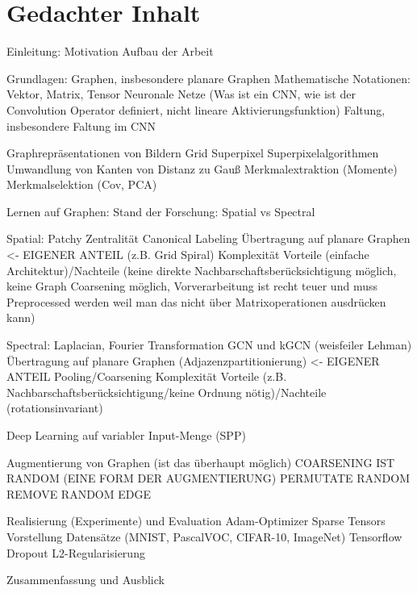 \chapter{Gedachter Inhalt}

Einleitung:
Motivation
Aufbau der Arbeit

Grundlagen:
Graphen, insbesondere planare Graphen
Mathematische Notationen: Vektor, Matrix, Tensor
Neuronale Netze (Was ist ein CNN, wie ist der Convolution Operator definiert, nicht lineare Aktivierungsfunktion)
Faltung, insbesondere Faltung im CNN

Graphrepräsentationen von Bildern
Grid
Superpixel
Superpixelalgorithmen
Umwandlung von Kanten von Distanz zu Gauß
Merkmalextraktion (Momente)
Merkmalselektion (Cov, PCA)

Lernen auf Graphen:
Stand der Forschung: Spatial vs Spectral

Spatial:
Patchy
Zentralität
Canonical Labeling
Übertragung auf planare Graphen <- EIGENER ANTEIL (z.B. Grid Spiral)
Komplexität
Vorteile (einfache Architektur)/Nachteile (keine direkte Nachbarschaftsberücksichtigung möglich, keine Graph Coarsening möglich, Vorverarbeitung ist recht teuer und muss Preprocessed werden weil man das nicht über Matrixoperationen ausdrücken kann)

Spectral:
Laplacian, Fourier Transformation
GCN und kGCN (weisfeiler Lehman)
Übertragung auf planare Graphen (Adjazenzpartitionierung) <- EIGENER ANTEIL
Pooling/Coarsening
Komplexität
Vorteile (z.B. Nachbarschaftsberücksichtigung/keine Ordnung nötig)/Nachteile (rotationsinvariant)

Deep Learning auf variabler Input-Menge (SPP)

Augmentierung von Graphen (ist das überhaupt möglich)
COARSENING IST RANDOM (EINE FORM DER AUGMENTIERUNG)
PERMUTATE RANDOM
REMOVE RANDOM EDGE

Realisierung (Experimente) und Evaluation
Adam-Optimizer
Sparse Tensors
Vorstellung Datensätze (MNIST, PascalVOC, CIFAR-10, ImageNet)
Tensorflow
Dropout L2-Regularisierung

Zusammenfassung und Ausblick
